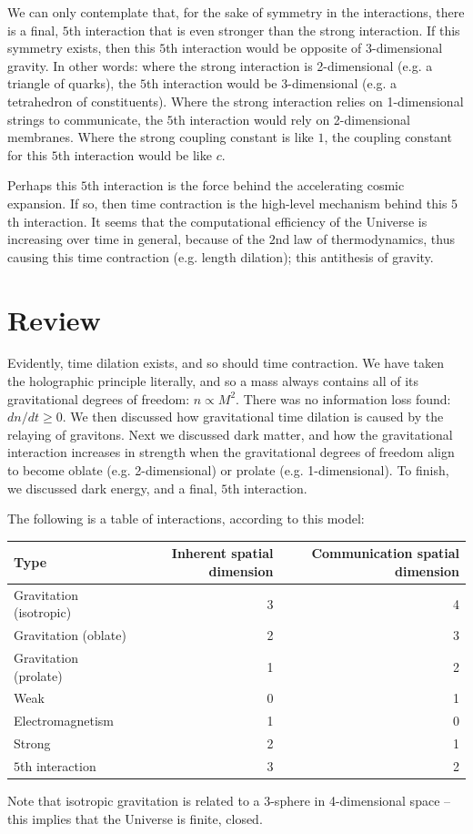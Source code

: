 \documentclass[12pt]{article}
\begin{document}
{We can only contemplate that, for the sake of symmetry in the interactions, there is a final, $5$th interaction that is even stronger than the strong interaction.
If this symmetry exists, then this $5$th interaction would be opposite of 3-dimensional gravity.
In other words: where the strong interaction is 2-dimensional (e.g. a triangle of quarks), the $5$th interaction would be 3-dimensional (e.g. a tetrahedron of constituents).
Where the strong interaction relies on 1-dimensional strings to communicate, the $5$th interaction would rely on 2-dimensional membranes.
Where the strong coupling constant is like $1$, the coupling constant for this $5$th interaction would be like $c$.

Perhaps this $5$th interaction is the force behind the accelerating cosmic expansion.
If so, then time contraction is the high-level mechanism behind this $5$th interaction.
It seems that the computational efficiency of the Universe is increasing over time in general, because of the $2$nd law of thermodynamics, thus causing this time contraction (e.g. length dilation); this antithesis of gravity.






\section{Review}

Evidently, time dilation exists, and so should time contraction.
We have taken the holographic principle literally, and so a mass always contains all of its gravitational degrees of freedom: $n \propto M^2$.
There was no information loss found: $dn/dt \geq 0$.
We then discussed how gravitational time dilation is caused by the relaying of gravitons.
Next we discussed dark matter, and how the gravitational interaction increases in strength when the gravitational degrees of freedom align to become oblate (e.g. 2-dimensional) or prolate (e.g. 1-dimensional).
To finish, we discussed dark energy, and a final, $5$th interaction.

The following is a table of interactions, according to this model:
\begin{center}
\begin{tabular}{| l | r | r |}
  \hline
  Type & Inherent spatial dimension & Communication spatial dimension \\
\hline
\hline
Gravitation (isotropic) & 3  & 4\\
Gravitation (oblate) & 2 & 3\\
Gravitation (prolate) & 1 & 2\\
Weak & 0 & 1\\
Electromagnetism & 1 & 0 \\
Strong & 2 & 1\\
$5$th interaction & 3 & 2 \\
  \hline  
\end{tabular}
\end{center}
Note that isotropic gravitation is related to a 3-sphere in 4-dimensional space -- this implies that the Universe is finite, closed.




}
\end{document}
